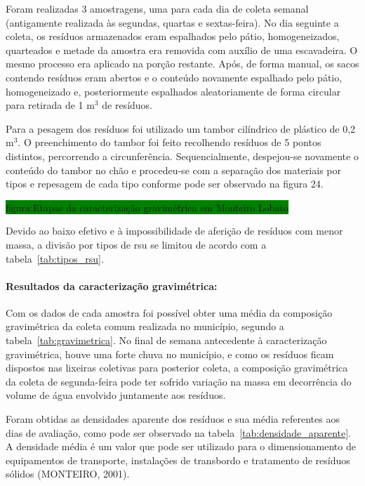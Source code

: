 	Foram realizadas 3 amostragens, uma para cada dia de coleta semanal (antigamente realizada às segundas, quartas e sextas-feira). No dia seguinte a coleta, os resíduos armazenados eram espalhados pelo pátio, homogeneizados, quarteados e metade da amostra era removida com auxílio de uma escavadeira. O mesmo processo era aplicado na porção restante. Após, de forma manual, os sacos contendo resíduos eram abertos e o conteúdo novamente espalhado pelo pátio, homogeneizado e, posteriormente espalhados aleatoriamente de forma circular para retirada de 1 m$^{3}$ de resíduos.
	
	Para a pesagem dos resíduos foi utilizado um tambor cilíndrico de plástico de 0,2 m$^{3}$. O preenchimento do tambor foi feito recolhendo resíduos de 5 pontos distintos, percorrendo a circunferência. Sequencialmente, despejou-se novamente o conteúdo do tambor no chão e procedeu-se com a separação dos materiais por tipos e repesagem de cada tipo conforme pode ser observado na figura 24.
	
	\colorbox{green}{figura:Etapas da caracterização gravimétrica em Monteiro Lobato}
	
	Devido ao baixo efetivo e à impossibilidade de aferição de resíduos com menor massa, a divisão por tipos de \gls{rsu} se limitou de acordo com a tabela~\ref{tab:tipos_rsu}.
	
%		
	
	\paragraph{\textbf{Resultados da caracterização gravimétrica:}}
	
	Com os dados de cada amostra foi possível obter uma média da composição gravimétrica da coleta comum realizada no município, segundo a tabela~\ref{tab:gravimetrica}. No final de semana antecedente à caracterização gravimétrica, houve uma forte chuva no município, e como os resíduos ficam dispostos nas lixeiras coletivas para posterior coleta, a composição gravimétrica da coleta de segunda-feira pode ter sofrido variação na massa em decorrência do volume de água envolvido juntamente aos resíduos.
	
%	
	
		
	Foram obtidas as densidades aparente dos resíduos e sua média referentes aos dias de avaliação, como pode ser observado na tabela~\ref{tab:densidade_aparente}. A densidade média é um valor que pode ser utilizado para o dimensionamento de equipamentos de transporte, instalações de transbordo e tratamento de resíduos sólidos (MONTEIRO, 2001).
	
